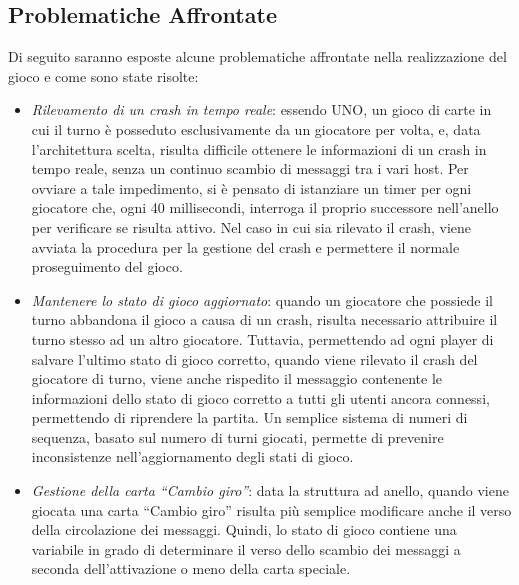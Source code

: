 \documentclass[11pt]{article} %
\begin{document}
\subsection{Problematiche Affrontate}
Di seguito saranno esposte alcune problematiche affrontate nella realizzazione del gioco e come sono state risolte:
\begin{itemize}
  \item \emph{Rilevamento di un crash in tempo reale}: essendo UNO, un gioco di carte in cui il turno è posseduto esclusivamente da un giocatore per volta, e,
  data l'architettura scelta, risulta difficile ottenere le informazioni di un crash in tempo reale, senza un continuo scambio di messaggi tra i vari host.
  Per ovviare a tale impedimento, si è pensato di istanziare un timer per ogni giocatore che, ogni 40 millisecondi, interroga il proprio successore nell'anello
  per verificare se risulta attivo. Nel caso in cui sia rilevato il crash, viene avviata la procedura per la gestione del crash e permettere il normale 
  proseguimento del gioco.
  \item \emph{Mantenere lo stato di gioco aggiornato}: quando un giocatore che possiede il turno abbandona il gioco a causa di un crash, risulta necessario attribuire il turno stesso ad un altro giocatore. Tuttavia, permettendo ad ogni player di salvare l'ultimo stato di gioco corretto, quando viene rilevato il crash del 
  giocatore di turno, viene anche rispedito il messaggio contenente le informazioni dello stato di gioco corretto a tutti gli utenti ancora connessi, permettendo di riprendere la partita. Un semplice sistema di numeri di sequenza, basato sul numero di turni giocati, permette di prevenire inconsistenze nell'aggiornamento degli stati di gioco.
  \item \emph{Gestione della carta ``Cambio giro''}: data la struttura ad anello, quando viene giocata una carta ``Cambio giro'' risulta più semplice modificare
  anche il verso della circolazione dei messaggi. Quindi, lo stato di gioco contiene una variabile in grado di determinare il verso dello scambio dei messaggi
  a seconda dell'attivazione o meno della carta speciale.
\end{itemize}

\vspace{3mm}
\end{document}

